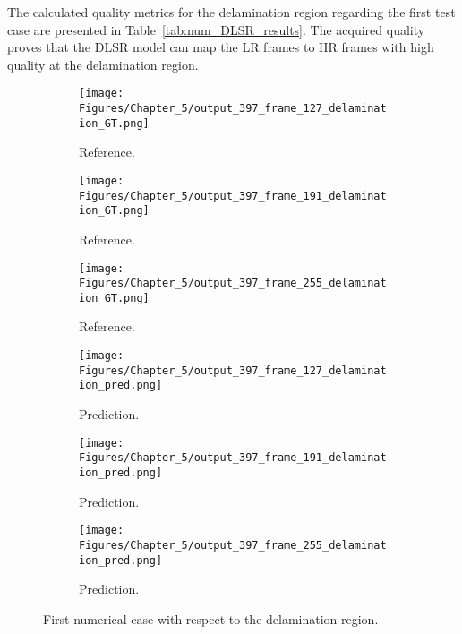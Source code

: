 The calculated quality metrics for the delamination region regarding the first test case are presented in Table~\ref{tab:num_DLSR_results}.
The acquired quality proves that the DLSR model can map the LR frames to HR frames with high quality at the delamination region.

\begin{figure} [!ht]
	\centering
	\begin{subfigure}[b]{.32\textwidth}
		\centering
		\texttt{[image: Figures/Chapter\_5/output\_397\_frame\_127\_delamination\_GT.png]}
		\caption{Reference.}
		\label{fig:ref_397_damage_127}
	\end{subfigure}
	\begin{subfigure}[b]{.32\textwidth}
		\centering
		\texttt{[image: Figures/Chapter\_5/output\_397\_frame\_191\_delamination\_GT.png]}
		\caption{Reference.}
		\label{fig:ref_397_damage_191}
	\end{subfigure}
	\begin{subfigure}[b]{.32\textwidth}
		\centering
		\texttt{[image: Figures/Chapter\_5/output\_397\_frame\_255\_delamination\_GT.png]}
		\caption{Reference.}
		\label{fig:ref_397_damage_255}	
	\end{subfigure}
	\begin{subfigure}[b]{.32\textwidth}
		\centering
		\texttt{[image: Figures/Chapter\_5/output\_397\_frame\_127\_delamination\_pred.png]}
		\caption{Prediction.}
		\label{fig:pred_397_damage_127}
	\end{subfigure}
	\begin{subfigure}[b]{.32\textwidth}
		\centering
		\texttt{[image: Figures/Chapter\_5/output\_397\_frame\_191\_delamination\_pred.png]}
		\caption{Prediction.}
		\label{fig:pred_397_damage_191}
	\end{subfigure}
	\begin{subfigure}[b]{.32\textwidth}
		\centering
		\texttt{[image: Figures/Chapter\_5/output\_397\_frame\_255\_delamination\_pred.png]}
		\caption{Prediction.}
		\label{fig:pred_397_damage_255}	
	\end{subfigure}
	\caption{First numerical case with respect to the delamination region.}
	\label{fig:num_results_CS_damage_area_397}
\end{figure}


